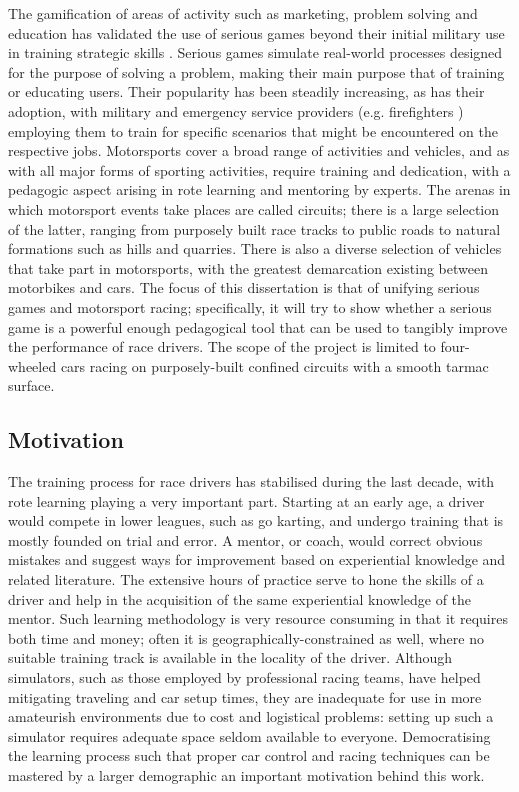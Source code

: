 \documentclass{article}
\begin{document}
The gamification of areas of activity such as marketing, problem solving and education \cite{michael2005serious} has validated the use of serious games beyond their initial military use in training strategic skills \cite{djaouti2011classifying}.  Serious games simulate real-world processes designed for the purpose of solving a problem, making their main purpose that of training or educating users. Their popularity has been steadily increasing, as has their adoption, with military \cite{djaouti2011classifying} and emergency service providers (e.g. firefighters \cite{michael2005serious}) employing them to train for specific scenarios that might be encountered on the respective jobs. Motorsports cover a broad range of activities and vehicles, and as with all major forms of sporting activities, require training and dedication, with a pedagogic aspect arising in rote learning and mentoring by experts. The arenas in which motorsport events take places are called circuits; there is a large selection of the latter, ranging from purposely built race tracks to public roads to natural formations such as hills and quarries. There is also a diverse selection of vehicles that take part in motorsports, with the greatest demarcation existing between motorbikes and cars. The focus of this dissertation is that of unifying serious games and motorsport racing; specifically, it will try to show whether a serious game is a powerful enough pedagogical tool that can be used to tangibly improve the performance of race drivers. The scope of the project is limited to four-wheeled cars racing on purposely-built confined circuits with a smooth tarmac surface.  

\subsection{Motivation}
The training process for race drivers has stabilised during the last decade, with rote learning playing a very important part. Starting at an early age, a driver would compete in lower leagues, such as go karting, and undergo training that is mostly founded on trial and error. A mentor, or coach, would correct obvious mistakes and suggest ways for improvement based on experiential knowledge and related literature. The extensive hours of practice serve to hone the skills of a driver and help in the acquisition of the same experiential knowledge of the mentor. Such learning methodology is very resource consuming in that it requires both time and money; often it is geographically-constrained as well, where no suitable training track is available in the locality of the driver. Although simulators, such as those employed by professional racing teams, have helped mitigating traveling and car setup times, they are inadequate for use in more amateurish environments due to cost and logistical problems: setting up such a simulator requires adequate space seldom available to everyone. Democratising the learning process such that proper car control and racing techniques can be mastered by a larger demographic an important motivation behind this work.
\end{document}

